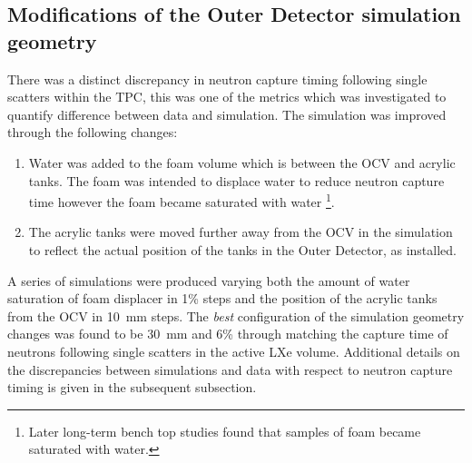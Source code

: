 \subsection{Modifications of the Outer Detector simulation geometry}\label{sec:VetoEff/GeometryEdits}
There was a distinct discrepancy in neutron capture timing following single scatters within the TPC, this was one of the metrics which was investigated to quantify difference between data and simulation.
The simulation was improved through the following changes:
\begin{enumerate}
	\item Water was added to the foam volume which is between the OCV and acrylic tanks. The foam was intended to displace water to reduce neutron capture time however the foam became saturated with water \footnote{Later long-term bench top studies found that samples of foam became saturated with water.}.
	\item The acrylic tanks were moved further away from the OCV in the simulation to reflect the actual position of the tanks in the Outer Detector, as installed.
\end{enumerate}
A series of simulations were produced varying both the amount of water saturation of foam displacer in 1\% steps and the position of the acrylic tanks from the OCV in 10~mm steps. The \textit{best} configuration of the simulation geometry changes was found to be 30~mm and 6\% through matching the capture time of neutrons following single scatters in the active LXe volume. Additional details on the discrepancies between simulations and data with respect to neutron capture timing is given in the subsequent subsection.
